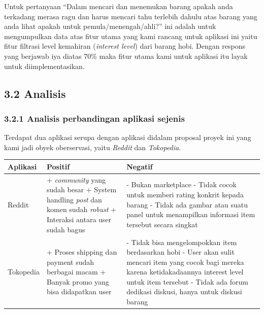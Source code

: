 \documentclass[a4paper]{article}
\begin{document}
Untuk pertanyaan “Dalam mencari dan menemukan barang apakah anda terkadang merasa ragu dan harus mencari tahu terlebih dahulu atas barang yang anda lihat apakah untuk pemula/menengah/ahli?” ini adalah untuk mengumpulkan data atas fitur utama yang kami rancang untuk aplikasi ini yaitu fitur filtrasi level kemahiran (\textit{interest level}) dari barang hobi. Dengan respons yang berjawab iya diatas 70\% maka fitur utama kami untuk aplikasi itu layak untuk diimplementasikan.

\subsection*{3.2 Analisis}

\subsubsection*{3.2.1 Analisis perbandingan aplikasi sejenis}
Terdapat dua aplikasi serupa dengan aplikasi didalam proposal proyek ini yang kami jadi obyek oberservasi, yaitu \textit{Reddit} dan \textit{Tokopedia}.

\begin{longtable}{|m{2cm}|p{5cm}|p{5cm}|}
    \hline
    Aplikasi & Positif & Negatif \\ 
    \hline
    Reddit 
    &   + \textit{community} yang sudah besar \newline 
        + System handling \textit{post} dan komen sudah \textit{robust} \newline 
        + Interaksi antara user sudah bagus 
    &   - Bukan marketplace \newline 
        - Tidak cocok untuk memberi rating konkrit kepada barang \newline 
        - Tidak ada gambar atau suatu panel untuk menampilkan informasi item tersebut secara singkat \\ 
    \hline
    Tokopedia
    &   + Proses shipping dan payment sudah berbagai macam \newline  
        + Banyak promo yang bisa didapatkan user  
    &   - Tidak bisa mengelompokkan item berdasarkan hobi \newline 
        - User akan sulit mencari item yang cocok bagi mereka karena ketidakadaannya interest level untuk item tersebut \newline 
        - Tidak ada forum dedikasi diskusi, hanya untuk diskusi barang \\ 
    \hline
\end{longtable}
\end{document}
